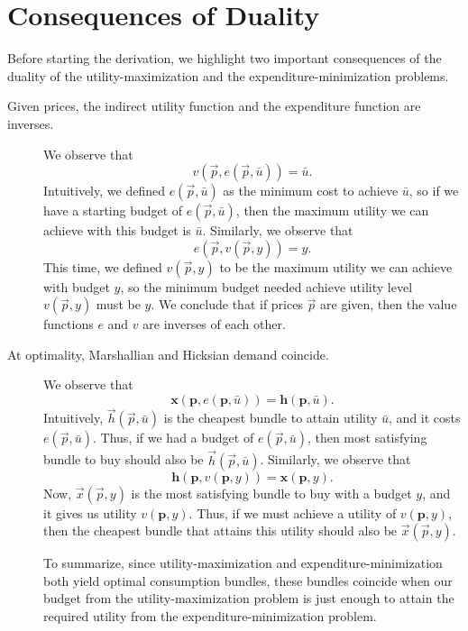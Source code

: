 \section{Consequences of Duality}
Before starting the derivation, we highlight two important consequences of the duality of the utility-maximization and the expenditure-minimization problems. 
\begin{description}
\item[Given prices, the indirect utility function and the expenditure function are inverses.]
We observe that
$$v(\vec{p}, e(\vec{p}, \bar{u})) = \bar{u}.$$
Intuitively, we defined $e(\vec{p}, \bar{u})$ as the minimum cost to achieve $\bar{u}$, so if we have a starting budget of $e(\vec{p}, \bar{u})$, then the maximum utility we can achieve with this budget is $\bar{u}$.
Similarly, we observe that 
$$e(\vec{p}, v(\vec{p}, y)) = y.$$
This time, we defined $v(\vec{p}, y)$ to be the maximum utility we can achieve with budget $y$, so the minimum budget needed achieve utility level $v(\vec{p}, y)$ must be $y$. We conclude that if prices $\vec{p}$ are given, then the value functions $e$ and $v$ are inverses of each other.

\item[At optimality, Marshallian and Hicksian demand coincide.] 
We observe that 
$$\mathbf{x}(\mathbf{p}, e(\mathbf{p}, \bar{u}))=\mathbf{h}(\mathbf{p}, \bar{u}).$$
Intuitively, $\vec{h}(\vec{p}, \bar{u})$ is the cheapest bundle to attain utility $\bar{u}$, and it costs $e(\vec{p}, \bar{u})$. Thus, if we had a budget of $e(\vec{p}, \bar{u})$, then most satisfying bundle to buy should also be $\vec{h}(\vec{p}, \bar{u})$.
Similarly, we observe that
$$\mathbf{h}(\mathbf{p}, v(\mathbf{p}, y))=\mathbf{x}(\mathbf{p}, y).$$
Now, $\vec{x}(\vec{p}, y)$ is the most satisfying bundle to buy with a budget $y$, and it gives us utility $v(\mathbf{p}, y)$. Thus, if we must achieve a utility of $v(\mathbf{p}, y)$, then the cheapest bundle that attains this utility should also be $\vec{x}(\vec{p}, y)$. 

To summarize, since utility-maximization and expenditure-minimization both yield optimal consumption bundles, these bundles coincide when our budget from the utility-maximization problem is just enough to attain the required utility from the expenditure-minimization problem. 
\end{description}

